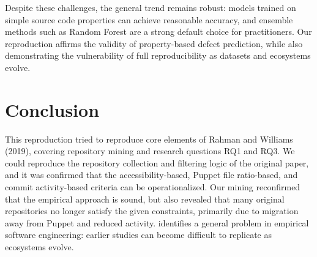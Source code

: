 \documentclass[conference]{IEEEtran}
\begin{document}
Despite these challenges, the general trend remains robust: models trained on simple source code properties can achieve reasonable accuracy, and ensemble methods such as Random Forest are a strong default choice for practitioners.
Our reproduction affirms the validity of property-based defect prediction, while also demonstrating the vulnerability of full reproducibility as datasets and ecosystems evolve.

	
	\section{Conclusion}
This reproduction tried to reproduce core elements of Rahman and Williams (2019), covering repository mining and research questions RQ1 and RQ3.
We could reproduce the repository collection and filtering logic of the original paper, and it was confirmed that the accessibility-based, Puppet file ratio-based, and commit activity-based criteria can be operationalized.
Our mining reconfirmed that the empirical approach is sound, but also revealed that many original repositories no longer satisfy the given constraints, primarily due to migration away from Puppet and reduced activity.
\tThis identifies a general problem in empirical software engineering: earlier studies can become difficult to replicate as ecosystems evolve.
\end{document}
